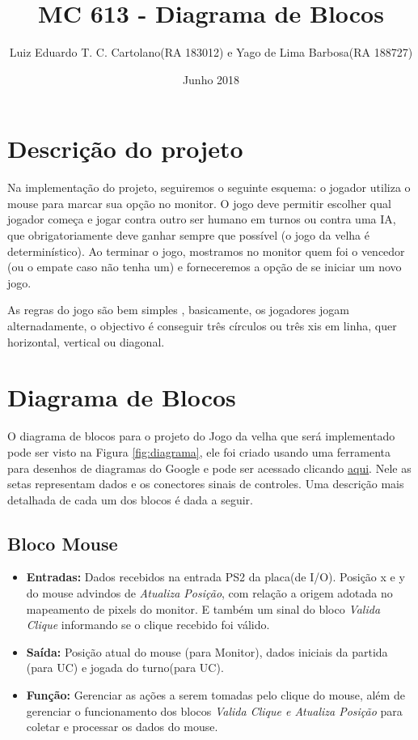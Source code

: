 \documentclass{article}
\begin{document}
\title{MC 613 - Diagrama de Blocos}
\author{Luiz Eduardo T. C. Cartolano(RA 183012)
        e Yago de Lima Barbosa(RA 188727) }
\date{Junho 2018}

\maketitle

\section{Descrição do projeto}
Na implementação do projeto, seguiremos o seguinte esquema: o jogador utiliza o mouse para marcar sua opção no monitor. O jogo deve permitir escolher qual jogador começa e jogar contra outro ser humano em turnos ou contra uma IA, que obrigatoriamente deve ganhar sempre que possível (o jogo da velha é determinístico). Ao terminar o jogo, mostramos no monitor quem foi o vencedor (ou o empate caso não tenha um) e forneceremos a opção de se iniciar um novo jogo. 

As regras do jogo são bem simples \cite{ref:velha-regras}, basicamente, os jogadores jogam alternadamente, o objectivo é conseguir três círculos ou três xis em linha, quer horizontal, vertical ou diagonal.


\section{Diagrama de Blocos}
O diagrama de blocos para o projeto do Jogo da velha que será implementado pode ser visto na Figura \ref{fig:diagrama}, ele foi criado usando uma ferramenta para desenhos de diagramas do Google e pode ser acessado clicando \href{https://drive.google.com/file/d/1U_X492n2xRLVOVa0kffrWD5SYa2kWRCx/view?usp=sharing}{aqui}. Nele as setas representam dados e os conectores sinais de controles. Uma descrição mais detalhada de cada um dos blocos é dada a seguir.
   
    \subsection{Bloco Mouse}
        \begin{itemize}
            \item \textbf{Entradas:} Dados recebidos na entrada PS2 da placa(de I/O). Posição x e y do mouse advindos de \emph{Atualiza Posição}, com relação a origem adotada no mapeamento de pixels do monitor. E também um sinal do bloco \emph{Valida Clique} informando se o clique recebido foi válido. 
            \item \textbf{Saída:} Posição atual do mouse (para Monitor), dados iniciais da partida (para UC) e jogada do turno(para UC).
            \item \textbf{Função:} Gerenciar as ações a serem tomadas pelo clique do mouse, além de gerenciar o funcionamento dos blocos \emph{Valida Clique e Atualiza Posição} para coletar e processar os dados do mouse.
        \end{itemize}
    
\end{document}
